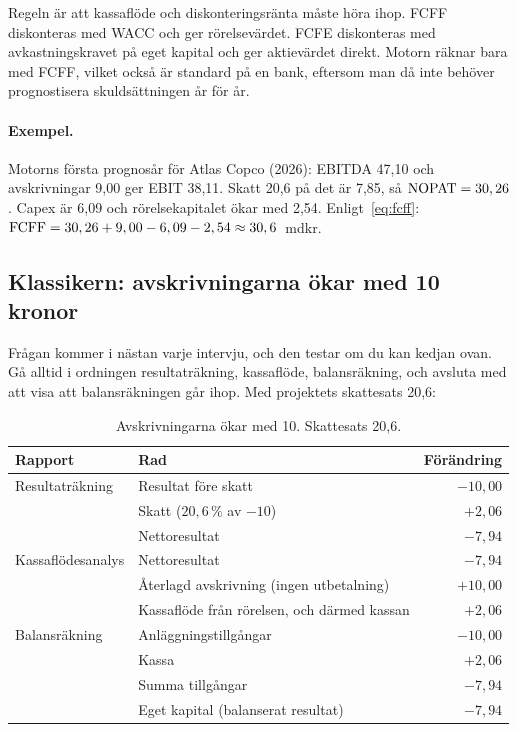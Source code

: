 Regeln är att kassaflöde och diskonteringsränta måste höra ihop. FCFF diskonteras med WACC och
ger rörelsevärdet. FCFE diskonteras med avkastningskravet på eget kapital och ger aktievärdet
direkt. Motorn räknar bara med FCFF, vilket också är standard på en bank, eftersom man då inte
behöver prognostisera skuldsättningen år för år.

\paragraph{Exempel.} Motorns första prognosår för Atlas Copco (2026): EBITDA 47,10 och
avskrivningar 9,00 ger EBIT 38,11. Skatt 20,6\pct{} på det är 7,85, så $\mathrm{NOPAT} = 30,26$. Capex är
6,09 och rörelsekapitalet ökar med 2,54. Enligt~\eqref{eq:fcff}:
$\mathrm{FCFF} = 30,26 + 9,00 - 6,09 - 2,54 \approx 30,6$~mdkr.

\subsection{Klassikern: avskrivningarna ökar med 10 kronor}
\label{sec:avskrivning10}

Frågan kommer i nästan varje intervju, och den testar om du kan kedjan ovan. Gå alltid i
ordningen resultaträkning, kassaflöde, balansräkning, och avsluta med att visa att
balansräkningen går ihop. Med projektets skattesats 20,6\pct:

\begin{table}[H]
\centering\small
\caption{Avskrivningarna ökar med 10\kr. Skattesats 20,6\pct.}
\label{tab:avskrivning}
\begin{tabular}{@{}llr@{}}
\toprule
Rapport & Rad & Förändring \\
\midrule
Resultaträkning & Resultat före skatt & $-10,00$ \\
                & Skatt ($20,6\,\%$ av $-10$) & $+2,06$ \\
                & Nettoresultat & $-7,94$ \\
\addlinespace
Kassaflödesanalys & Nettoresultat & $-7,94$ \\
                  & Återlagd avskrivning (ingen utbetalning) & $+10,00$ \\
                  & Kassaflöde från rörelsen, och därmed kassan & $+2,06$ \\
\addlinespace
Balansräkning & Anläggningstillgångar & $-10,00$ \\
              & Kassa & $+2,06$ \\
              & Summa tillgångar & $-7,94$ \\
              & Eget kapital (balanserat resultat) & $-7,94$ \\
\bottomrule
\end{tabular}
\end{table}

